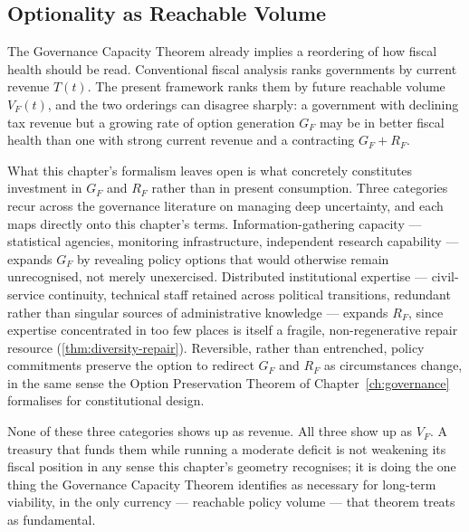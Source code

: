 \documentclass[12pt,twoside,openright]{book}
\newcounter{exercise}[chapter]
\begin{document}
\subsection{Optionality as Reachable Volume}
\label{sec:ch27-optionality}

The Governance Capacity Theorem already implies a reordering
of how fiscal health should be read. Conventional fiscal
analysis ranks governments by current revenue $T(t)$.
The present framework ranks them by future reachable volume
$V_F(t)$, and the two orderings can disagree sharply: a
government with declining tax revenue but a growing rate of
option generation $G_F$ may be in better fiscal health than
one with strong current revenue and a contracting $G_F + R_F$.

What this chapter's formalism leaves open is what concretely
constitutes investment in $G_F$ and $R_F$ rather than in
present consumption. Three categories recur across the
governance literature on managing deep uncertainty, and each
maps directly onto this chapter's terms. Information-gathering
capacity --- statistical agencies, monitoring infrastructure,
independent research capability --- expands $G_F$ by revealing
policy options that would otherwise remain unrecognised, not
merely unexercised. Distributed institutional expertise ---
civil-service continuity, technical staff retained across
political transitions, redundant rather than singular sources
of administrative knowledge --- expands $R_F$, since expertise
concentrated in too few places is itself a fragile,
non-regenerative repair resource (\cref{thm:diversity-repair}).
Reversible, rather than entrenched, policy commitments
preserve the option to redirect $G_F$ and $R_F$ as
circumstances change, in the same sense the Option Preservation
Theorem of Chapter~\ref{ch:governance} formalises for
constitutional design.

None of these three categories shows up as revenue. All three
show up as $V_F$. A treasury that funds them while running a
moderate deficit is not weakening its fiscal position in any
sense this chapter's geometry recognises; it is doing the one
thing the Governance Capacity Theorem identifies as necessary
for long-term viability, in the only currency --- reachable
policy volume --- that theorem treats as fundamental.
\end{document}
